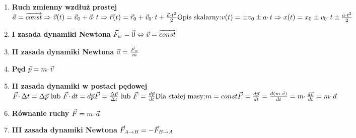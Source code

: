 \documentclass{article}
\begin{document}
\begin{enumerate}
		\item \textbf{Ruch zmienny wzdłuż prostej} $ \\
		\vec{a} = \overrightarrow{const} \Rightarrow \vec{v}(t) = \vec{v}_0 + \vec{a} \cdotp t \Rightarrow \vec{r}(t) = \vec{r}_0 + \vec{v}_0 \cdotp t + \frac{\vec{a} \cdotp t^2}{2}
		\\
		\text{Opis skalarny:}
		\\
		v(t) = \pm v_0 \pm a \cdotp t \Rightarrow x(t) = x_0 \pm v_0 \cdotp t \pm \frac{a \cdotp t^2}{2}
		$
		
		\item \textbf{I zasada dynamiki Newtona} $ \\
		\vec{F}_w = \vec{0} \Leftrightarrow \vec{v} = \overrightarrow{const}
		$
		
		\item \textbf{II zasada dynamiki Newtona} $ \\
		\vec{a} = \frac{\vec{F}_w}{m}
		$
		
		\item \textbf{Pęd} $ \\
		\vec{p} = m \cdotp \vec{v}
		$
		
		\item \textbf{II zasada dynamiki w postaci pędowej} $ \\
		\vec{F} \cdotp \Delta t = \Delta \vec{p} \text{ lub } \vec{F} \cdotp dt = d \vec{p}
		\\
		\vec{F} = \frac{\Delta \vec{p}}{\Delta t} \text{ lub } \vec{F} = \frac{d \vec{p}}{dt}
		\\
		\text{Dla stałej masy:}
		\\
		m = const
		\\
		\vec{F} = \frac{d \vec{p}}{dt} = \frac{d(m \cdotp \vec{v})}{dt} = m \cdotp \frac{d \vec{v}}{dt} = m \cdotp \vec{a}
		$
		
		\item \textbf{Równanie ruchy} $ \\
		\vec{F} = m \cdotp \vec{a}
		$
		
		\item \textbf{III zasada dynamiki Newtona} $ \\
		\vec{F}_{A \to B} = -\vec{F}_{B \to A}
		$
		
	\end{enumerate}
	
\end{document}
